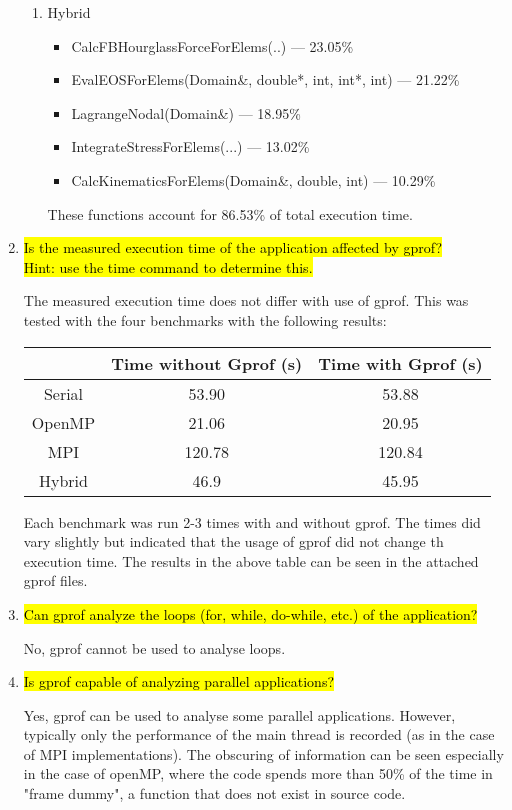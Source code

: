 \documentclass{article}
\begin{document}
\begin{enumerate}
\begin{enumerate}
		\item Hybrid
		\begin{itemize}
			\item CalcFBHourglassForceForElems(..) --- 23.05\%
			\item EvalEOSForElems(Domain\&, double*, int, int*, int) --- 21.22\%
			\item LagrangeNodal(Domain\&) --- 18.95\%
			\item IntegrateStressForElems(...) --- 13.02\%
			\item CalcKinematicsForElems(Domain\&, double, int) --- 10.29\%
		\end{itemize}
		These functions account for 86.53\% of total execution time.
	\end{enumerate}

	\item \hl{Is the measured execution time of the application affected by gprof? \\Hint: use the time command to determine this.}

	The measured execution time does not differ with use of gprof. This was tested with the four benchmarks with the following results:
	\begin{center}
		\begin{tabular}{|c|c|c|}
			\hline
			&Time without Gprof (s) & Time with Gprof (s)\\
			\hline
			Serial &53.90&53.88\\ \hline
			OpenMP &21.06&20.95\\ \hline
			MPI &120.78&120.84\\ \hline
			Hybrid &46.9&45.95\\ \hline
		\end{tabular}
	\end{center}
	Each benchmark was run 2-3 times with and without gprof. The times did vary slightly but indicated that the usage of gprof did not change th execution time. The results in the above table can be seen in the attached gprof files.

	\item \hl{Can gprof analyze the loops (for, while, do-while, etc.) of the application?}

	No, gprof cannot be used to analyse loops.
	
	\item \hl{Is gprof capable of analyzing parallel applications?}

	Yes, gprof can be used to analyse some parallel applications. However, typically only the performance of the main thread is recorded (as in the case of MPI implementations). The obscuring of information can be seen especially in the case of openMP, where the code spends more than 50\% of the time in "frame dummy", a function that does not exist in source code.


\end{enumerate}
\end{document}
